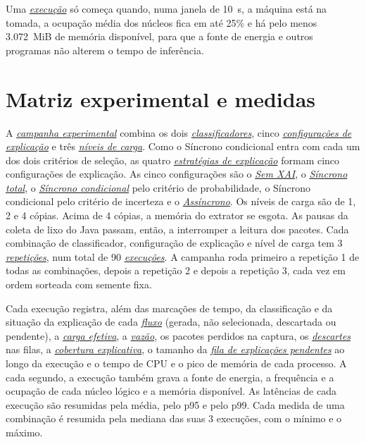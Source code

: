 \documentclass[
  12pt,
  oneside,
  a4paper,
  chapter=TITLE,
  sumario=tradicional,
  english,
  brazil
]{abntex2}
\newcommand{\termo}[2]{\hyperref[gl:#1]{\emph{#2}}}
\begin{document}
Uma \termo{execucao}{execução} só começa quando, numa janela de 10~s, a máquina está na tomada, a
ocupação média dos núcleos fica em até 25\% e há pelo menos 3.072~MiB de memória disponível, para
que a fonte de energia e outros programas não alterem o tempo de inferência.

\section{Matriz experimental e medidas}
\label{sec:matriz}

A \termo{campanha}{campanha experimental} combina os dois \termo{classificador}{classificadores},
cinco \termo{configuracao}{configurações de explicação} e três \termo{nivel-carga}{níveis de carga}. Como o Síncrono
condicional entra com cada um dos dois critérios de seleção, as quatro
\termo{estrategia}{estratégias de explicação} formam cinco configurações de explicação. As cinco
configurações são o \termo{sem-xai}{Sem XAI}, o \termo{sincrono-total}{Síncrono total}, o
\termo{sincrono-condicional}{Síncrono condicional} pelo critério de probabilidade, o Síncrono
condicional pelo critério de incerteza e o \termo{assincrono}{Assíncrono}. Os níveis de carga são de
1, 2 e 4 cópias. Acima de 4 cópias, a memória do extrator se esgota. As pausas da coleta de lixo do
Java passam, então, a interromper a leitura dos pacotes. Cada combinação de classificador,
configuração de explicação e nível de carga tem 3 \termo{repeticao}{repetições}, num total de 90
\termo{execucao}{execuções}. A campanha roda primeiro a repetição 1 de todas as combinações, depois
a repetição 2 e depois a repetição 3, cada vez em ordem sorteada com semente fixa.

Cada execução registra, além das marcações de tempo, da classificação e da situação da explicação
de cada \termo{fluxo}{fluxo} (gerada, não selecionada, descartada ou pendente), a \termo{carga-efetiva}{carga efetiva}, a \termo{vazao}{vazão}, os
pacotes perdidos na captura, os \termo{descarte}{descartes} nas filas, a
\termo{cobertura-explicativa}{cobertura explicativa}, o tamanho da
\termo{fila-explicacoes}{fila de explicações pendentes} ao longo da execução e o tempo de CPU e o
pico de memória de cada processo. A cada segundo, a execução também grava a fonte de energia, a
frequência e a ocupação de cada núcleo lógico e a memória disponível. As latências de cada execução são resumidas pela média,
pelo p95 e pelo p99. Cada medida de uma combinação é resumida pela mediana das suas 3 execuções, com
o mínimo e o máximo.
\end{document}
